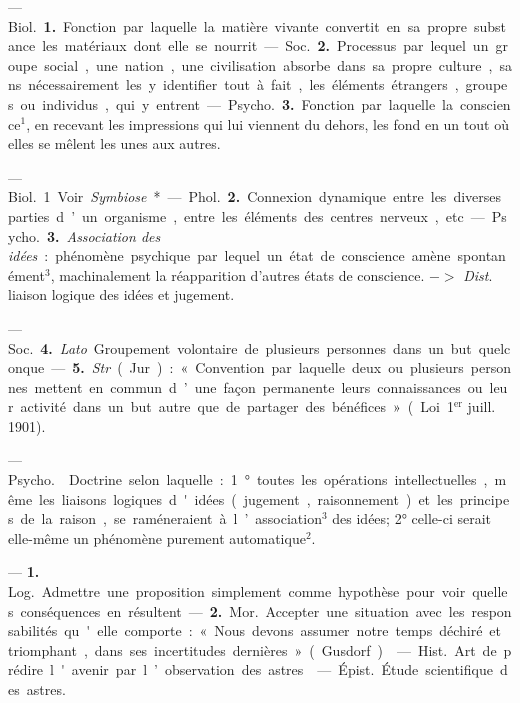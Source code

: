 \begin{itemize}[leftmargin=1cm, label=, itemsep=1pt]
{{ — \si{Biol.} {\bf 1.} Fonction
par laquelle la matière vivante convertit en sa propre substance les
matériaux dont elle se nourrit.

— \si{Soc.} {\bf 2.} Processus par lequel un
groupe social, une nation, une civilisation absorbe dans sa propre
culture, sans nécessairement les y identifier tout à fait,
les éléments étrangers, groupes ou individus, qui y
entrent.

— \si{Psycho.} {\bf 3.} Fonction par laquelle la conscience$^1$, en recevant
les impressions qui lui viennent du
dehors, les fond en un tout où elles
se mêlent les unes aux autres.


 — \si{Biol.} 1 Voir {\it Symbiose}*.

— \si{Phol.} {\bf 2.} Connexion dynamique
entre les diverses parties d’un organisme, entre les éléments des centres
nerveux, etc.

— \si{Psycho.} {\bf 3.} {\it Association des
idées} : phénomène psychique par
lequel un état de conscience amène
spontanément$^3$, machinalement la
réapparition d’autres états de conscience. $->$ {\it Dist}. liaison logique
des idées et jugement.

— \si{Soc.} {\bf 4.} {\it Lato}. Groupement
volontaire de plusieurs personnes
dans un but quelconque. — {\bf 5.} {\it Str}.
(Jur.) : « Convention par laquelle
deux ou plusieurs personnes mettent
en commun d’une façon permanente
leurs connaissances ou leur activité
dans un but autre que de partager
des bénéfices ». (Loi 1$^\text{er}$ juill. 1901).

 — \si{Psycho.}  Doctrine selon laquelle : 1° toutes les
opérations intellectuelles, même les
liaisons logiques d'idées (jugement,
raisonnement) et les principes de la
raison, se raméneraient à l’association$^3$ des idées; 2° celle-ci serait
elle-même un phénomène purement
automatique$^2$.

 — {\bf 1.} \si{Log.} Admettre une
proposition simplement comme hypothèse pour voir quelles
conséquences en résultent.

— {\bf 2.} \si{Mor.} Accepter une situation avec les responsabilités qu'elle
comporte : « Nous devons assumer
notre temps déchiré et triomphant,
dans ses incertitudes dernières »
(Gusdorf).

 — \si{Hist.} Art de prédire
l'avenir par l’observation des astres.

 — \si{Épist.} Étude scientifique des astres.

}}
\end{itemize}
